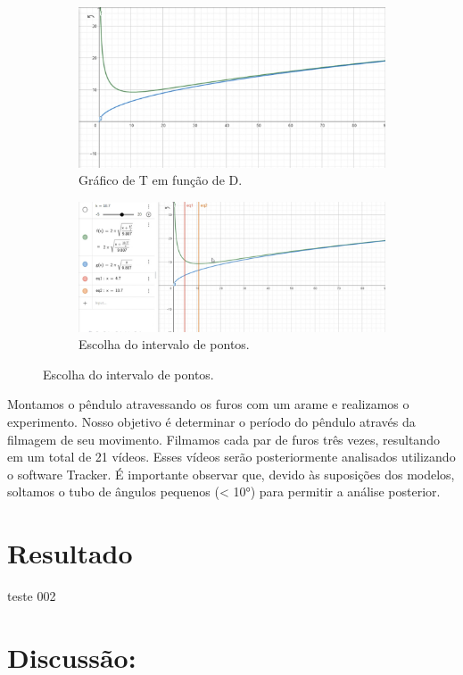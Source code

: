\documentclass[hidelinks,a4paper,12pt]{article}
\begin{document}
\begin{figure}[H]
    \begin{subfigure}{0.5\textwidth }
        \centering
        \includegraphics[width=0.9\linewidth]{grafico1.png}
        \caption{Gráfico de T em função de D.}
        \label{fig:1.2}
    \end{subfigure}%
    \begin{subfigure}{0.5\textwidth }
        \centering
        \includegraphics[width=0.9\linewidth]{grafico2.png}
        \caption{Escolha do intervalo de pontos.}
        \label{fig: 1.3}
    \end{subfigure}
 \end{figure}

\qquad Montamos o pêndulo atravessando os furos com um arame e realizamos o experimento. Nosso objetivo é determinar o período do pêndulo através da filmagem de seu movimento. Filmamos cada par de furos três vezes, resultando em um total de 21 vídeos. Esses vídeos serão posteriormente analisados utilizando o software Tracker. É importante observar que, devido às suposições dos modelos, soltamos o tubo de ângulos pequenos (< 10°) para permitir a análise posterior.

\section*{Resultado}
\qquad teste 002
\section*{Discussão:}
\end{document}
